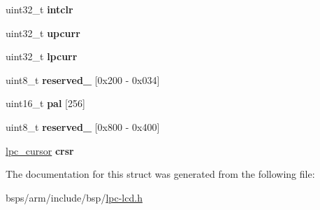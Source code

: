 \begin{DoxyCompactItemize}
\mbox{\label{structlpc__lcd_ad44f16ae1d8af0d5950b019c328bc617}} 
uint32\+\_\+t {\bfseries intclr}
\item 
\mbox{\label{structlpc__lcd_a451fc39b101a7e360d22519169d5e0bc}} 
uint32\+\_\+t {\bfseries upcurr}
\item 
\mbox{\label{structlpc__lcd_a92aa27795e262aa84816c6a0f91b4a19}} 
uint32\+\_\+t {\bfseries lpcurr}
\item 
\mbox{\label{structlpc__lcd_a50960460f1616323f6014e27be2ec6c8}} 
uint8\+\_\+t {\bfseries reserved\+\_} \mbox{[}0x200 -\/ 0x034\mbox{]}
\item 
\mbox{\label{structlpc__lcd_a025940e6d4fb103bc75713df5fc44d03}} 
uint16\+\_\+t {\bfseries pal} \mbox{[}256\mbox{]}
\item 
\mbox{\label{structlpc__lcd_a355432d2d898ed4c1c9c1aa599b1f467}} 
uint8\+\_\+t {\bfseries reserved\+\_} \mbox{[}0x800 -\/ 0x400\mbox{]}
\item 
\mbox{\label{structlpc__lcd_a83db0c500725c9bbc06498b3f94b886f}} 
\mbox{\hyperlink{structlpc__cursor}{lpc\+\_\+cursor}} {\bfseries crsr}
\end{DoxyCompactItemize}


The documentation for this struct was generated from the following file\+:\begin{DoxyCompactItemize}
\item 
bsps/arm/include/bsp/\mbox{\hyperlink{lpc-lcd_8h}{lpc-\/lcd.\+h}}\end{DoxyCompactItemize}

